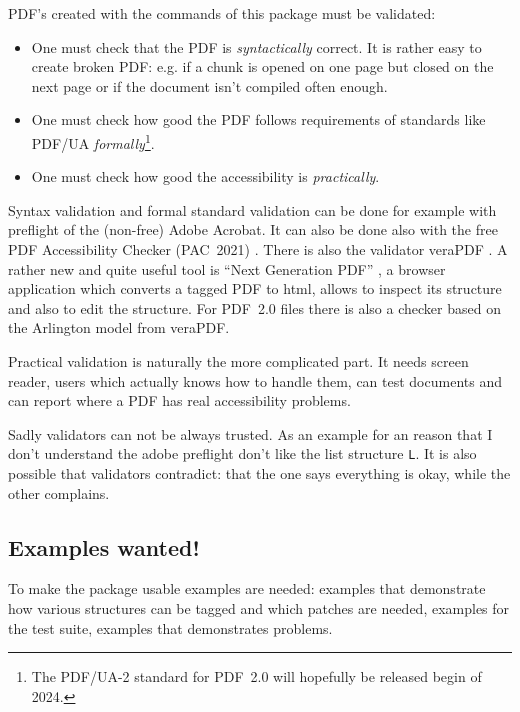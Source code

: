 \documentclass[bibliography=totoc,a4paper]{article}
\newcommand\PDF{PDF}
\begin{document}
\PDF{}'s created with the commands of this package must be validated:

\begin{itemize}
\item
 One must check that the \PDF{} is \emph{syntactically} correct. 
 It is rather easy to create broken \PDF{}:
 e.g. if a chunk is opened on one page but closed 
 on the next page or if the document isn't compiled often enough.

\item One must check how good the PDF follows requirements of standards 
    like PDF/UA \emph{formally}\footnote{The PDF/UA-2 standard for \PDF~2.0 
    will hopefully be released begin of 2024.}. 

\item
One must check how good the accessibility is \emph{practically}.
\end{itemize}


Syntax validation and formal standard validation can be done for example with 
preflight of the (non-free) Adobe Acrobat. It can also be done also with the 
free \PDF{} Accessibility Checker (PAC~2021) \parencite{pac3}. There is also 
the validator veraPDF \parencite{verapdf}. A rather new and quite useful tool 
is \enquote{Next Generation PDF} \parencite{ngpdf}, a browser application 
which converts a tagged PDF to html, allows to inspect its structure and also 
to edit the structure. For PDF~2.0 files there is also a checker based on the 
Arlington model from veraPDF. 

Practical validation is naturally the more complicated part. 
It needs screen reader, users which actually knows how to handle them, 
can test documents and can report where a \PDF{} has real accessibility problems.



Sadly validators can not be always trusted. 
As an example for an reason that I don't understand the adobe preflight 
don't like the list structure \texttt{L}.
It is also possible that validators contradict: that the one says everything is okay, 
while the other complains.

\subsection{Examples wanted!}

To make the package usable examples are needed: examples that demonstrate how 
various structures can be tagged and which patches are needed, examples for 
the test suite, examples that demonstrates problems. 
\end{document}
